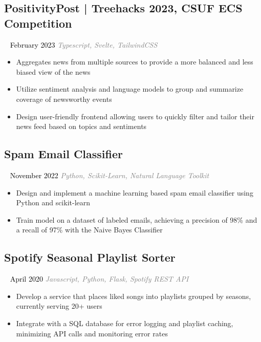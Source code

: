 \documentclass{article}
\newcommand{\resumesection}[3]{
    \subsection*{#1}
    \ 
    \normalsize
    \normalsize
    \hfill
    \textcolor{black}{#3}
    \normalsize
    \newline
    \small
    \textcolor{grey}{\emph{#2}}
}
\begin{document}
\resumesection{PositivityPost | Treehacks 2023, CSUF ECS Competition}{Typescript, Svelte, TailwindCSS}{February 2023}
\begin{itemize}
    \item Aggregates news from multiple sources to provide a more balanced and less biased view of the news
    \item Utilize sentiment analysis and language models to group and summarize coverage of newsworthy events
    \item Design user-friendly frontend allowing users to quickly filter and tailor their news feed based on topics and sentiments
\end{itemize}

\resumesection{Spam Email Classifier}{Python, Scikit-Learn, Natural Language Toolkit}{November 2022}
\begin{itemize}
    \item Design and implement a machine learning based spam email classifier using Python and scikit-learn
    \item Train model on a dataset of labeled emails, achieving a precision of 98\% and a recall of 97\% with the Naive Bayes Classifier
\end{itemize}

\resumesection{Spotify Seasonal Playlist Sorter}{Javascript, Python, Flask, Spotify REST API}{April 2020}
\begin{itemize}
    \item Develop a service that places liked songs into playlists grouped by seasons, currently serving 20+ users
    \item Integrate with a SQL database for error logging and playlist caching, minimizing API calls and monitoring error rates
\end{itemize}
\end{document}
